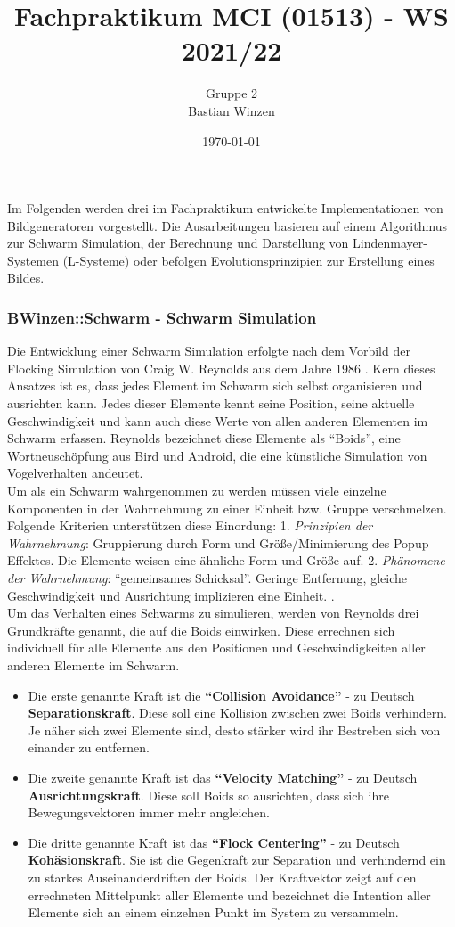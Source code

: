 \documentclass[../mciAusarbeitung.tex]{subfiles}
\title{Fachpraktikum MCI (01513) - WS 2021/22}
\author{Gruppe 2\\
	Bastian Winzen}
\date{\today}
\begin{document}
Im Folgenden werden drei im Fachpraktikum entwickelte Implementationen von Bildgeneratoren vorgestellt. Die Ausarbeitungen basieren auf einem Algorithmus zur Schwarm Simulation, der Berechnung und Darstellung von Lindenmayer-Systemen (L-Systeme) oder befolgen Evolutionsprinzipien zur Erstellung eines Bildes.


\subsubsection{BWinzen::Schwarm - Schwarm Simulation}
	Die Entwicklung einer Schwarm Simulation erfolgte nach dem Vorbild der Flocking Simulation von Craig W. Reynolds aus dem Jahre 1986 \cite{reynolds1987flocks}.
	Kern dieses Ansatzes ist es, dass jedes Element im Schwarm sich selbst organisieren und ausrichten kann. Jedes dieser Elemente kennt seine Position, seine aktuelle Geschwindigkeit und kann auch diese Werte von allen anderen Elementen im Schwarm erfassen. Reynolds bezeichnet diese Elemente als ``Boids'', eine Wortneuschöpfung aus Bird und Android, die eine künstliche Simulation von Vogelverhalten andeutet.\\
	
	Um als ein Schwarm wahrgenommen zu werden müssen viele einzelne Komponenten in der Wahrnehmung zu einer Einheit bzw. Gruppe verschmelzen. Folgende Kriterien unterstützen diese Einordung: 1. \textit{Prinzipien der Wahrnehmung}: Gruppierung durch Form und Größe/Minimierung des Popup Effektes. Die Elemente weisen eine ähnliche Form und Größe auf. 2. \textit {Phänomene der Wahrnehmung}: ``gemeinsames Schicksal''. Geringe Entfernung, gleiche Geschwindigkeit und Ausrichtung implizieren eine Einheit. \cite{PetersSS21EMCI}.\\
	
	Um das Verhalten eines Schwarms zu simulieren, werden von Reynolds drei Grundkräfte genannt, die auf die Boids einwirken. Diese errechnen sich individuell für alle Elemente aus den Positionen und Geschwindigkeiten aller anderen Elemente im Schwarm.
	\begin{itemize}
	\item[]Die erste genannte Kraft ist die \textbf{``Collision Avoidance''} - zu Deutsch \textbf{Separationskraft}. Diese soll eine Kollision zwischen zwei Boids verhindern. Je näher sich zwei Elemente sind, desto stärker wird ihr Bestreben sich von einander zu entfernen.
	\item[]Die zweite genannte Kraft ist das \textbf{``Velocity Matching''} - zu Deutsch \textbf{Ausrichtungskraft}. Diese soll Boids so ausrichten, dass sich ihre Bewegungsvektoren immer mehr angleichen.  
	\item[]Die dritte genannte Kraft ist das \textbf{``Flock Centering''} - zu Deutsch \textbf{Kohäsionskraft}. Sie ist die Gegenkraft zur Separation und verhindernd ein zu starkes Auseinanderdriften der Boids. Der Kraftvektor zeigt auf den errechneten Mittelpunkt aller Elemente und bezeichnet die Intention aller Elemente sich an einem einzelnen Punkt im System zu versammeln.
	\end{itemize}
	
\end{document}
